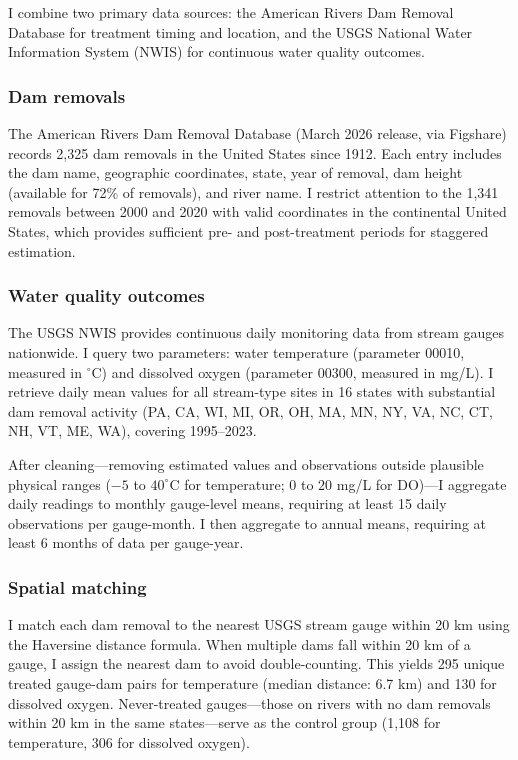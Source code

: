 \documentclass[12pt]{article}
\begin{document}
I combine two primary data sources: the American Rivers Dam Removal Database for treatment timing and location, and the USGS National Water Information System (NWIS) for continuous water quality outcomes.

\subsubsection*{Dam removals} The American Rivers Dam Removal Database (March 2026 release, via Figshare) records 2,325 dam removals in the United States since 1912. Each entry includes the dam name, geographic coordinates, state, year of removal, dam height (available for 72\% of removals), and river name. I restrict attention to the 1,341 removals between 2000 and 2020 with valid coordinates in the continental United States, which provides sufficient pre- and post-treatment periods for staggered estimation.

\subsubsection*{Water quality outcomes} The USGS NWIS provides continuous daily monitoring data from stream gauges nationwide. I query two parameters: water temperature (parameter 00010, measured in $^{\circ}$C) and dissolved oxygen (parameter 00300, measured in mg/L). I retrieve daily mean values for all stream-type sites in 16 states with substantial dam removal activity (PA, CA, WI, MI, OR, OH, MA, MN, NY, VA, NC, CT, NH, VT, ME, WA), covering 1995--2023.

After cleaning---removing estimated values and observations outside plausible physical ranges ($-5$ to $40^{\circ}$C for temperature; $0$ to $20$ mg/L for DO)---I aggregate daily readings to monthly gauge-level means, requiring at least 15 daily observations per gauge-month. I then aggregate to annual means, requiring at least 6 months of data per gauge-year.

\subsubsection*{Spatial matching} I match each dam removal to the nearest USGS stream gauge within 20 km using the Haversine distance formula. When multiple dams fall within 20 km of a gauge, I assign the nearest dam to avoid double-counting. This yields 295 unique treated gauge-dam pairs for temperature (median distance: 6.7 km) and 130 for dissolved oxygen. Never-treated gauges---those on rivers with no dam removals within 20 km in the same states---serve as the control group (1,108 for temperature, 306 for dissolved oxygen).
\end{document}

